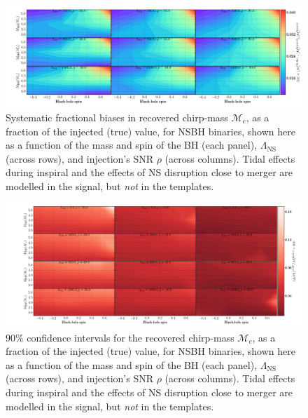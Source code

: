 \documentclass[aps,prd,amsmath,floats,floatfix, twocolumn,
superscriptaddress,nofootinbib,showpacs]{revtex4-1}
\newcommand{\lambdans}{\Lambda_\mathrm{NS}}
\newcommand{\mchirp}{\mathcal{M}_c}
\begin{document}
\begin{figure}
\centering 
\includegraphics[trim={{0.2\columnwidth} 0 0 0},width=2.1\columnwidth]{plots-TN/TN_MchirpBiases_Lambda_SNR.pdf}
\caption{Systematic fractional biases in recovered chirp-mass $\mchirp$, as a
fraction of the injected (true) value, for NSBH binaries, shown here as a 
function of the mass and spin of the BH (each panel), $\lambdans$ (across 
rows), and injection's SNR $\rho$ (across columns). Tidal effects during
inspiral and the effects of NS disruption close to merger are modelled in the
signal, but \textit{not} in the templates. 
}
\label{fig:TNT_chirpMassBias_vs_SNR_q23}
\end{figure}
% 
\begin{figure}
\centering
\includegraphics[trim={{0.4\columnwidth} 0 0 0},width=2.2\columnwidth]{plots-TN/TN_MchirpCIWidths90_0_Lambda_SNR.pdf}
\caption{$90\%$ confidence intervals for the recovered chirp-mass $\mchirp$, as a
fraction of the injected (true) value, for NSBH binaries, shown here as a 
function of the mass and spin of the BH (each panel), $\lambdans$ (across 
rows), and injection's SNR $\rho$ (across columns). Tidal effects during
inspiral and the effects of NS disruption close to merger are modelled in the
signal, but \textit{not} in the templates. 
}
\label{fig:TNT_chirpMassCIWidth90_vs_SNR_q23}
\end{figure}
% 
\newpage
\newpage
\end{document}
